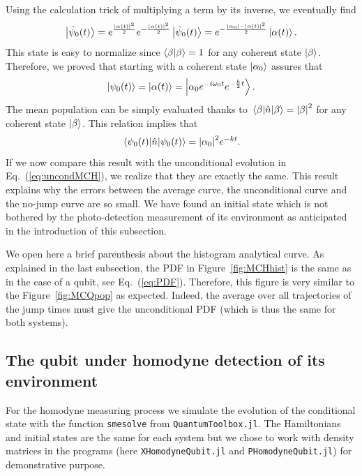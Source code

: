 Using the calculation trick of multiplying a term by its inverse, we eventually find
\begin{equation}
    \ket{\tilde{\psi}_0(t)} = e^{\frac{\abs{\alpha(t)}^2}{2}}e^{-\frac{\abs{\alpha(t)}^2}{2}}\ket{\tilde{\psi}_0(t)} = e^{-\frac{\abs{\alpha_0}-\abs{\alpha(t)}^2}{2}}\ket{\alpha(t)}.
\end{equation}
This state is easy to normalize since $\braket{\beta}=1$ for any coherent state $\ket{\beta}$. Therefore, we proved that starting with a coherent state $\ket{\alpha_0}$ assures that
\begin{equation}
    \ket{\psi_0(t)} = \ket{\alpha(t)} = \ket{\alpha_0 e^{-i\omega_0 t}e^{-\frac{k}{2}  t}}.
\end{equation}
The mean population can be simply evaluated thanks to $\expval{\hat{n}}{\beta} = \abs{\beta}^2$ for any coherent state $\ket{\beta}$. This relation implies that
\begin{equation}
    \expval{\hat{n}}{\psi_0(t)} = \abs{\alpha_0}^2 e^{-k t}.
\end{equation}
If we now compare this result with the unconditional evolution in Eq.~(\ref{eq:uncondMCH}), we realize that they are exactly the same. This result explains why the errors between the average curve, the unconditional curve and the no-jump curve are so small. We have found an initial state which is not bothered by the photo-detection measurement of its environment as anticipated in the introduction of this subsection. 

We open here a brief parenthesis about the histogram analytical curve. As explained in the last subsection, the PDF in Figure~\ref{fig:MCHhist} is the same as in the case of a qubit, see Eq.~(\ref{eq:PDF}). Therefore, this figure is very similar to the Figure~\ref{fig:MCQpop} as expected. Indeed, the average over all trajectories of the jump times must give the unconditional PDF (which is thus the same for both systems).

\subsection{The qubit under homodyne detection of its environment}
For the homodyne measuring process we simulate the evolution of the conditional state with the function \verb|smesolve| from \verb|QuantumToolbox.jl|. The Hamiltonians and initial states are the same for each system but we chose to work with density matrices in the programs (here \verb|XHomodyneQubit.jl| and \verb|PHomodyneQubit.jl|) for demonstrative purpose. 

